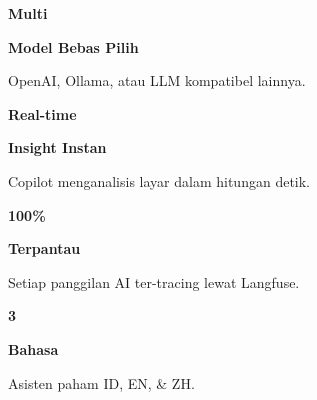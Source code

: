 \documentclass[a4paper]{article}
\begin{document}
\noindent
\begin{minipage}[t]{0.485\textwidth}
    \noindent\colorbox{BlueBg}{%
        \begin{minipage}[t][2.7cm][c]{\dimexpr\linewidth-2\fboxsep\relax}
            \centering
            {\fontsize{20}{24}\selectfont\bfseries\color{BluePrimary} Multi}\par\vspace{2pt}
            {\fontsize{9.5}{12}\selectfont\bfseries\color{BlueDark} Model Bebas Pilih}\par\vspace{2pt}
            {\fontsize{8.5}{11}\selectfont\color{TextDark}OpenAI, Ollama, atau LLM kompatibel lainnya.}
        \end{minipage}}\par
    \vspace{6pt}
    \noindent\colorbox{BlueBg}{%
        \begin{minipage}[t][2.7cm][c]{\dimexpr\linewidth-2\fboxsep\relax}
            \centering
            {\fontsize{20}{24}\selectfont\bfseries\color{BluePrimary} Real-time}\par\vspace{2pt}
            {\fontsize{9.5}{12}\selectfont\bfseries\color{BlueDark} Insight Instan}\par\vspace{2pt}
            {\fontsize{8.5}{11}\selectfont\color{TextDark}Copilot menganalisis layar dalam hitungan detik.}
        \end{minipage}}%
\end{minipage}%
\hfill
\begin{minipage}[t]{0.485\textwidth}
    \noindent\colorbox{BlueBg}{%
        \begin{minipage}[t][2.7cm][c]{\dimexpr\linewidth-2\fboxsep\relax}
            \centering
            {\fontsize{20}{24}\selectfont\bfseries\color{BluePrimary} 100\%}\par\vspace{2pt}
            {\fontsize{9.5}{12}\selectfont\bfseries\color{BlueDark} Terpantau}\par\vspace{2pt}
            {\fontsize{8.5}{11}\selectfont\color{TextDark}Setiap panggilan AI ter-tracing lewat Langfuse.}
        \end{minipage}}\par
    \vspace{6pt}
    \noindent\colorbox{BlueBg}{%
        \begin{minipage}[t][2.7cm][c]{\dimexpr\linewidth-2\fboxsep\relax}
            \centering
            {\fontsize{20}{24}\selectfont\bfseries\color{BluePrimary} 3}\par\vspace{2pt}
            {\fontsize{9.5}{12}\selectfont\bfseries\color{BlueDark} Bahasa}\par\vspace{2pt}
            {\fontsize{8.5}{11}\selectfont\color{TextDark}Asisten paham ID, EN, \& ZH.}
        \end{minipage}}%
\end{minipage}
\end{document}
